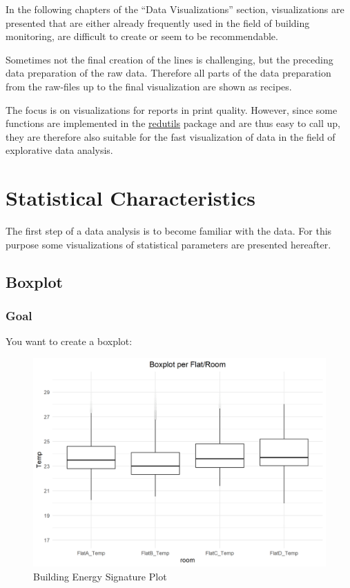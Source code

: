 \documentclass[
  a4paperpaper,
]{book}
\begin{document}
In the following chapters of the ``Data Visualizations'' section, visualizations are presented that are either already frequently used in the field of building monitoring, are difficult to create or seem to be recommendable.

Sometimes not the final creation of the lines is challenging, but the preceding data preparation of the raw data. Therefore all parts of the data preparation from the raw-files up to the final visualization are shown as recipes.

The focus is on visualizations for reports in print quality. However, since some functions are implemented in the \href{https://github.com/hslu-ige-laes/redutils}{redutils} package and are thus easy to call up, they are therefore also suitable for the fast visualization of data in the field of explorative data analysis.

\hypertarget{statistical-characteristics}{%
\chapter{Statistical Characteristics}\label{statistical-characteristics}}

The first step of a data analysis is to become familiar with the data. For this purpose some visualizations of statistical parameters are presented hereafter.

\newpage

\hypertarget{boxplot}{%
\section{Boxplot}\label{boxplot}}

\hypertarget{goal}{%
\subsection{Goal}\label{goal}}

You want to create a boxplot:

\begin{figure}
\includegraphics[width=0.7\linewidth]{images/boxplot} \caption{Building Energy Signature Plot}\label{fig:unnamed-chunk-10}
\end{figure}
\end{document}
